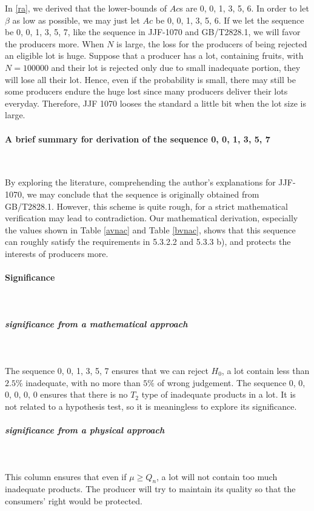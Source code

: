 \documentclass[conf]{new-aiaa}
\begin{document}
In \ref{ra}, we derived that the lower-bounds of $Ac$s are 0, 0, 1, 3, 5, 6. In order to let $\beta$ as low as possible, we may just let $Ac$ be 0, 0, 1, 3, 5, 6. If we let the sequence be 0, 0, 1, 3, 5, 7, like the sequence in JJF-1070 and GB/T2828.1, we will favor the producers more. When $N$ is large, the loss for the producers of being rejected an eligible lot is huge. Suppose that a producer has a lot, containing fruits, with $N=100000$ and their lot is rejected only due to small inadequate portion, they will lose all their lot. Hence, even if the probability is small, there may still be some producers endure the huge lost since many producers deliver their lots everyday. Therefore, JJF 1070 looses the standard a little bit when the lot size is large. \medskip

\paragraph{A brief summary for derivation of the sequence 0, 0, 1, 3, 5, 7}\ \medskip

By exploring the literature, comprehending the author's explanations for JJF-1070, we may conclude that the sequence is originally obtained from GB/T2828.1. However, this scheme is quite rough, for a strict mathematical verification may lead to contradiction. Our mathematical derivation, especially the values shown in Table \ref{avnac} and Table \ref{bvnac}, shows that this sequence can roughly satisfy the requirements in 5.3.2.2 and 5.3.3 b), and protects the interests of producers more.

\paragraph{Significance}\ \medskip

\subparagraph{significance from a mathematical approach}\ \medskip

The sequence 0, 0, 1, 3, 5, 7 ensures that we can reject $H_0$, a lot contain less than $2.5\%$ inadequate, with no more than $5\%$ of wrong judgement. The sequence 0, 0, 0, 0, 0, 0 ensures that there is no $T_2$ type of inadequate products in a lot. It is not related to a hypothesis test, so it is meaningless to explore its significance.

\subparagraph{significance from a physical approach}\ \medskip

This column ensures that even if $\mu \geqslant Q_n$, a lot will not contain too much inadequate products. The producer will try to maintain its quality so that the consumers' right would be protected.
\end{document}

